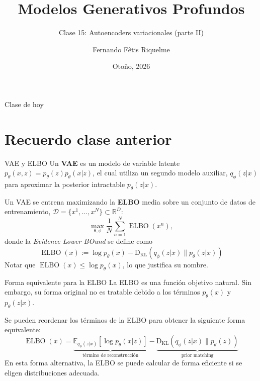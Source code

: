 \documentclass{beamer}
\title{Modelos Generativos Profundos}
\subtitle{Clase 15: Autoencoders variacionales (parte II)}
\author{Fernando Fêtis Riquelme}
\institute{
    Facultad de Ciencias Físicas y Matemáticas\\
    Universidad de Chile
}
\date{Otoño, 2026}
\newcommand{\R}{\mathbb{R}}
\begin{document}
\begin{frame}
    \titlepage
\end{frame}

\begin{frame}{Clase de hoy}
    \tableofcontents
\end{frame}

\section{Recuerdo clase anterior}

\begin{frame}{VAE y ELBO}
    Un \textbf{VAE} es un modelo de variable latente $p_\theta(x,z)=p_\theta(z)p_\theta(x|z)$, el cual utiliza un segundo modelo auxiliar, $q_\phi(z|x)$ para aproximar la posterior intractable $p_\theta(z|x)$.

    Un VAE se entrena maximizando la \textbf{ELBO} media sobre un conjunto de datos de entrenamiento, $\mathcal{D}=\{x^1,\ldots,x^N\}\subset\R^D$:
    \begin{equation*}
        \max_{\theta,\phi} \frac{1}{N}\sum_{n=1}^N \operatorname{ELBO}(x^n),
    \end{equation*}
    donde la \textit{Evidence Lower BOund} se define como
    \begin{equation*}
        \operatorname{ELBO}(x):=\log p_\theta(x)-\operatorname{{D}_{KL}}\left(q_\phi(z|x)\| p_\theta(z|x)\right)
    \end{equation*}
    Notar que $\operatorname{ELBO}(x) \leq \log p_\theta(x)$, lo que justifica su nombre.
\end{frame}

\begin{frame}{Forma equivalente para la ELBO}
    La ELBO es una función objetivo natural. Sin embargo, su forma original no es tratable debido a los términos $p_\theta(x)$ y $p_\theta(z|x)$.

    Se pueden reordenar los términos de la ELBO para obtener la siguiente forma equivalente:
    \begin{equation*}
        \operatorname{ELBO}(x) = \underbrace{\mathbb{E}_{q_\phi(z|x)}\left[\log p_\theta(x|z)\right]}_{\text{término de reconstrucción}} - \underbrace{\operatorname{{D}_{KL}}\left(q_\phi(z|x)\| p_\theta(z)\right)}_{\text{prior matching}}
    \end{equation*}
    En esta forma alternativa, la ELBO se puede calcular de forma eficiente si se eligen distribuciones adecuada.
\end{frame}
\end{document}
